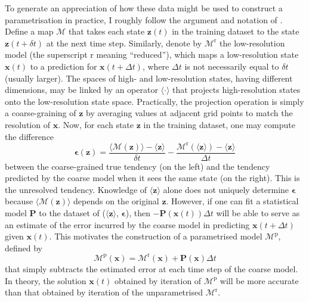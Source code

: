 \documentclass[titlepage,twoside]{article}
\numberwithin{equation}{section}
\renewcommand\vec{\bm}
\begin{document}
To generate an appreciation of how these data might be used to construct a
parametrisation in practice, I roughly follow the argument and notation of
\textcite{brajard2021}. Define a map $\mathcal{M}$ that takes each state
$\vec{z}(t)$ in the training dataset to the state $\vec{z}(t + \delta t)$ at
the next time step. Similarly, denote by $\mathcal{M}^\mathrm{r}$ the
low-resolution model (the superscript r meaning ``reduced''), which maps a
low-resolution state $\vec{x}(t)$ to a prediction for $\vec{x}(t + \Delta t)$,
where $\Delta t$ is not necessarily equal to $\delta t$ (usually larger). The
spaces of high- and low-resolution states, having different dimensions, may be
linked by an operator $\langle \cdot \rangle$ that projects high-resolution
states onto the low-resolution state space. Practically, the projection
operation is simply a coarse-graining of $\vec{z}$ by averaging values at
adjacent grid points to match the resolution of $\vec{x}$. Now, for each state
$\vec{z}$ in the training dataset, one may compute the difference
\begin{equation*}
    \vec{\epsilon}(\vec{z}) =
        \frac{
            \langle \mathcal{M}(\vec{z}) \rangle - \langle \vec{z} \rangle
        }{\delta t}
        - \frac{
            \mathcal{M}^\mathrm{r}(\langle \vec{z} \rangle)
            - \langle \vec{z} \rangle
        }{\Delta t}
\end{equation*}
between the coarse-grained true tendency (on the left) and the tendency
predicted by the coarse model when it sees the same state (on the right). This
is the unresolved tendency. Knowledge of $\langle \vec{z} \rangle$ alone does
not uniquely determine $\vec{\epsilon}$ because $\langle \mathcal{M}(\vec{z})
\rangle$ depends on the original $\vec{z}$. However, if one can fit a
statistical model $\vec{P}$ to the dataset of ($\langle \vec{z} \rangle$,
$\vec{\epsilon}$), then $-\vec{P}(\vec{x}(t)) \Delta t$ will be able to serve
as an estimate of the error incurred by the coarse model in predicting
$\vec{x}(t + \Delta t)$ given $\vec{x}(t)$. This motivates the construction of
a parametrised model $\mathcal{M}^\mathrm{p}$, defined by
\begin{equation*}
    \mathcal{M}^\mathrm{p}(\vec{x}) =
        \mathcal{M}^\mathrm{r}(\vec{x}) + \vec{P}(\vec{x}) \Delta t
\end{equation*}
that simply subtracts the estimated error at each time step of the coarse
model. In theory, the solution $\vec{x}(t)$ obtained by iteration of
$\mathcal{M}^\mathrm{p}$ will be more accurate than that obtained by
iteration of the unparametrised $\mathcal{M}^\mathrm{r}$.
\end{document}
